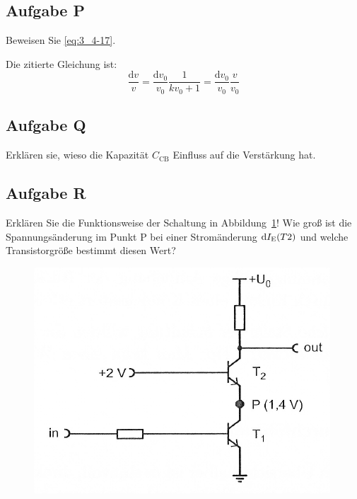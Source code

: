 \fehlt

\FloatBarrier
\subsection{Aufgabe P}

\begin{problem}
	Beweisen Sie \eqref{eq:3_4-17}.
\end{problem}

Die zitierte Gleichung ist:
\begin{equation}
	\label{eq:3_4-17}
	\frac{\mathrm d v} v
	= \frac{\mathrm d v_0}{v_0} \frac{1}{k v_0 + 1}
	= \frac{\mathrm d v_0}{v_0} \frac{v}{v_0}
\end{equation}

\fehlt

\FloatBarrier
\subsection{Aufgabe Q}

\begin{problem}
	Erklären sie, wieso die Kapazität $C_\text{CB}$ Einfluss auf die
	Verstärkung hat.
\end{problem}

\fehlt

\FloatBarrier
\subsection{Aufgabe R}

\begin{problem}
	Erklären Sie die Funktionsweise der Schaltung in
	Abbildung~\ref{fig:3_4-15}! Wie groß ist die Spannungsänderung im Punkt P
	bei einer Stromänderung $\mathrm d I_\text{E}(T2)$ und welche
	Transistorgröße bestimmt diesen Wert?
\end{problem}

\begin{figure}[htbp]
	\centering
	\includegraphics[width=.6\textwidth]{Anleitung/3_4-15.png}
	\caption{%
		\cite[Abbildung~3/4.15]{physik313-Anleitung}
	}
	\label{fig:3_4-15}
\end{figure}


